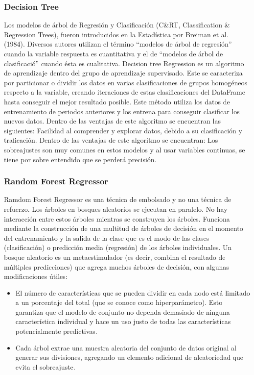 \subsubsection{Decision Tree}
Los modelos de \'arbol de Regresi\'on y Clasificaci\'on (C&RT, Classification & Regression Trees), fueron introducidos en la Estad\'istica por Breiman et al. (1984). Diversos autores utilizan el t\'ermino ``modelos de \'arbol de regresi\'on'' cuando la variable respuesta es cuantitativa y el de ``modelos de \'arbol de clasificaci\'o'' cuando \'esta es cualitativa. 
Decision tree Regression es un algoritmo de aprendizaje dentro del grupo de aprendizaje supervisado. Este se caracteriza por particionar o dividir los datos en varias clasificaciones de grupos homog\'eneos respecto a la variable, creando iteraciones de estas clasificaciones del DataFrame hasta conseguir el mejor resultado posible. Este m\'etodo utiliza los datos de entrenamiento de periodos anteriores y los entrena para conseguir clasificar los nuevos datos.
Dentro de las ventajas de este algoritmo se encuentran las siguientes:
Facilidad al comprender y explorar datos, debido a su clasificaci\'on y traficaci\'on. 
Dentro de las ventajas de este algoritmo se encuentran:
Los sobreajustes son muy comunes en estos modelos y al usar variables continuas, se tiene por sobre entendido que se perder\'a precisi\'on.

\subsubsection{Random Forest Regressor}
Ramdom Forest Regressor es una t\'ecnica de embolsado y no una t\'ecnica de refuerzo. Los \'arboles en bosques aleatorios se ejecutan en paralelo. No hay interacci\'on entre estos \'arboles mientras se construyen los \'arboles.
Funciona mediante la construcci\'on de una multitud de \'arboles de decisi\'on en el momento del entrenamiento y la salida de la clase que es el modo de las clases (clasificaci\'on) o predicci\'on media (regresi\'on) de los \'arboles individuales.
Un bosque aleatorio es un metaestimulador (es decir, combina el resultado de m\'ultiples predicciones) que agrega muchos \'arboles de decisi\'on, con algunas modificaciones \'utiles:

\begin{itemize}
    \item El n\'umero de caracter\'isticas que se pueden dividir en cada nodo est\'a limitado a un porcentaje del total (que se conoce como hiperpar\'ametro). Esto garantiza que el modelo de conjunto no dependa demasiado de ninguna caracter\'istica individual y hace un uso justo de todas las caracter\'isticas potencialmente predictivas.
    \item Cada \'arbol extrae una muestra aleatoria del conjunto de datos original al generar sus divisiones, agregando un elemento adicional de aleatoriedad que evita el sobreajuste.
\end{itemize}

